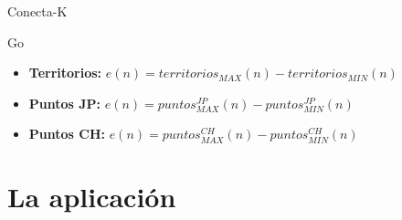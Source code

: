 \documentclass[10pt]{beamer}
\begin{document}
\begin{frame}[t]
\begin{block}{Conecta-K}
\begin{itemize}
\end{itemize}
\end{block}

\begin{block}{Go}
\begin{itemize}
\item \textbf{Territorios:}
$e(n) = territorios_{MAX}(n) - territorios_{MIN}(n)$
\item \textbf{Puntos JP:}
$e(n) = puntos_{MAX}^{JP}(n) - puntos_{MIN}^{JP}(n)$
\item \textbf{Puntos CH:}
$e(n) = puntos_{MAX}^{CH}(n) - puntos_{MIN}^{CH}(n)$
\end{itemize}
\end{block}
\end{frame}

%
%
%

\section{La aplicación}
\end{document}
